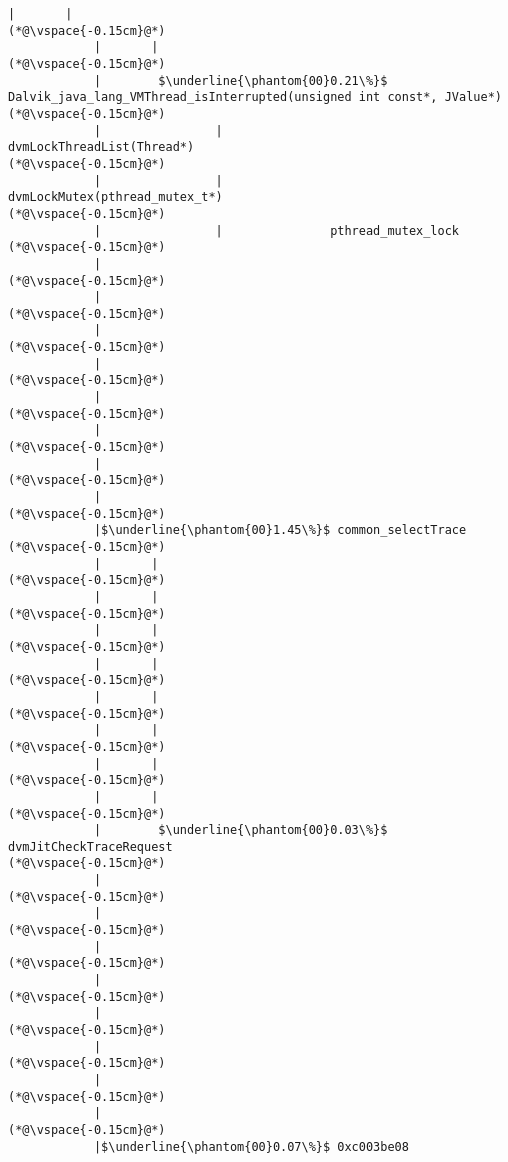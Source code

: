 \begin{lstlisting}[caption=20 viiteparametria Java$\to$C , label=profile:J2CBenchmark00206, numberbychapter=true, frame=lines, float, floatplacement=t]
            |       |
(*@\vspace{-0.15cm}@*)
            |       |
(*@\vspace{-0.15cm}@*)
            |        $\underline{\phantom{00}0.21\%}$ Dalvik_java_lang_VMThread_isInterrupted(unsigned int const*, JValue*)
(*@\vspace{-0.15cm}@*)
            |                |               dvmLockThreadList(Thread*)
(*@\vspace{-0.15cm}@*)
            |                |               dvmLockMutex(pthread_mutex_t*)
(*@\vspace{-0.15cm}@*)
            |                |               pthread_mutex_lock
(*@\vspace{-0.15cm}@*)
            |
(*@\vspace{-0.15cm}@*)
            |
(*@\vspace{-0.15cm}@*)
            |
(*@\vspace{-0.15cm}@*)
            |
(*@\vspace{-0.15cm}@*)
            |
(*@\vspace{-0.15cm}@*)
            |
(*@\vspace{-0.15cm}@*)
            |
(*@\vspace{-0.15cm}@*)
            |
(*@\vspace{-0.15cm}@*)
            |$\underline{\phantom{00}1.45\%}$ common_selectTrace
(*@\vspace{-0.15cm}@*)
            |       |
(*@\vspace{-0.15cm}@*)
            |       |
(*@\vspace{-0.15cm}@*)
            |       |
(*@\vspace{-0.15cm}@*)
            |       |
(*@\vspace{-0.15cm}@*)
            |       |
(*@\vspace{-0.15cm}@*)
            |       |
(*@\vspace{-0.15cm}@*)
            |       |
(*@\vspace{-0.15cm}@*)
            |       |
(*@\vspace{-0.15cm}@*)
            |        $\underline{\phantom{00}0.03\%}$ dvmJitCheckTraceRequest
(*@\vspace{-0.15cm}@*)
            |
(*@\vspace{-0.15cm}@*)
            |
(*@\vspace{-0.15cm}@*)
            |
(*@\vspace{-0.15cm}@*)
            |
(*@\vspace{-0.15cm}@*)
            |
(*@\vspace{-0.15cm}@*)
            |
(*@\vspace{-0.15cm}@*)
            |
(*@\vspace{-0.15cm}@*)
            |
(*@\vspace{-0.15cm}@*)
            |$\underline{\phantom{00}0.07\%}$ 0xc003be08


\end{lstlisting}
